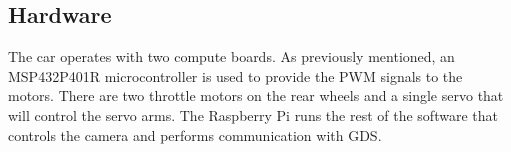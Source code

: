 \documentclass{article}
\begin{document}

\subsection{Hardware}

The car operates with two compute boards. As previously mentioned, an MSP432P401R microcontroller is used to provide the PWM signals to the motors. There are two throttle motors on the rear wheels and a single servo that will control the servo arms. The Raspberry Pi runs the rest of the software that controls the camera and performs communication with GDS.
\end{document}
